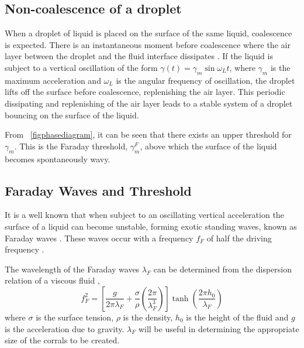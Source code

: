 \documentclass[11pt]{article}
\newcommand{\figref}[2][\figurename~]{#1\ref{#2}}
\begin{document}

\subsection{Non-coalescence of a droplet}
\label{secnoncoalescenceofadroplet}

When a droplet of liquid is placed on the surface of the same liquid, coalescence is expected.  There is an instantaneous moment before coalescence where the air layer between the droplet and the fluid interface dissipates \cite{2}.  If the liquid is subject to a vertical oscillation of the form $\gamma(t)=\gamma_m\sin\omega_L t$, where $\gamma_m$ is the maximum acceleration and $\omega_L$ is the angular frequency of oscillation, the droplet lifts off the surface before coalescence, replenishing the air layer.  This periodic dissipating and replenishing of the air layer leads to a stable system of a droplet bouncing on the surface of the liquid.

From \figref{figphasediagram}, it can be seen that there exists an upper threshold for $\gamma_m$.  This is the Faraday threshold, $\gamma_m^F$, above which the surface of the liquid becomes spontaneously wavy.

\subsection{Faraday Waves and Threshold}
\label{secfaradaywavesandthreshold}

It is a well known that when subject to an oscillating vertical acceleration the surface of a liquid can become unstable, forming exotic standing waves, known as Faraday waves \cite{20}.  These waves occur with a frequency $f_F$ of half the driving frequency \cite{15}.

The wavelength of the Faraday waves $\lambda_F$ can be determined from the dispersion relation of a viscous fluid \cite{8},
\begin{equation}
    \label{disp_rel}
    f_F^2=\left[\frac{g}{2\pi\lambda_F}+\frac{\sigma}{\rho}\left(\frac{2\pi}{\lambda_F^3}\right)\right]\tanh\left(\frac{2\pi h_0}{\lambda_F}\right)
\end{equation}
where $\sigma$ is the surface tension, $\rho$ is the density, $h_0$ is the height of the fluid and $g$ is the acceleration due to gravity.  $\lambda_F$ will be useful in determining the appropriate size of the corrals to be created.
\end{document}
